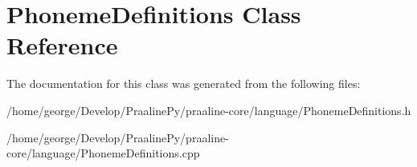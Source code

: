 \hypertarget{class_phoneme_definitions}{}\section{Phoneme\+Definitions Class Reference}
\label{class_phoneme_definitions}


The documentation for this class was generated from the following files\+:\begin{DoxyCompactItemize}
\item 
/home/george/\+Develop/\+Praaline\+Py/praaline-\/core/language/Phoneme\+Definitions.\+h\item 
/home/george/\+Develop/\+Praaline\+Py/praaline-\/core/language/Phoneme\+Definitions.\+cpp\end{DoxyCompactItemize}
